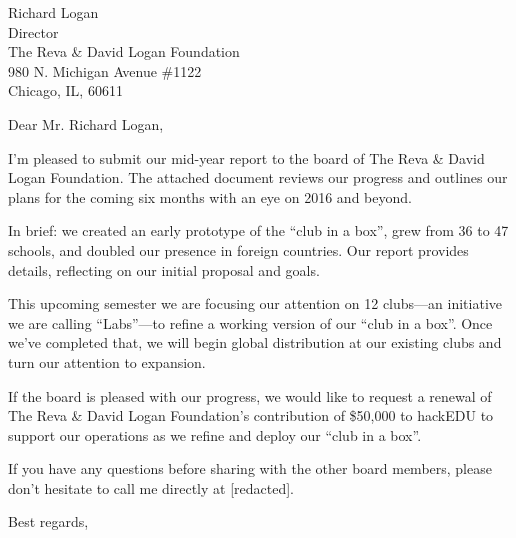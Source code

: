 \documentclass[11pt]{letter}
\begin{document}
\begin{letter}{
    Richard Logan \\
    Director \\
    The Reva \& David Logan Foundation \\
    980 N. Michigan Avenue \#1122 \\
    Chicago, IL, 60611
  }
  \opening{Dear Mr. Richard Logan,}

  I'm pleased to submit our mid-year report to the board of The Reva \& David
  Logan Foundation. The attached document reviews our progress and outlines our
  plans for the coming six months with an eye on 2016 and beyond.

  In brief: we created an early prototype of the ``club in a box'', grew from 36
  to 47 schools, and doubled our presence in foreign countries. Our report
  provides details, reflecting on our initial proposal and goals.

  This upcoming semester we are focusing our attention on 12 clubs---an
  initiative we are calling ``Labs''---to refine a working version of our ``club
  in a box''. Once we've completed that, we will begin global distribution at
  our existing clubs and turn our attention to expansion.

  If the board is pleased with our progress, we would like to request a renewal
  of The Reva \& David Logan Foundation's contribution of \$50,000 to hackEDU to
  support our operations as we refine and deploy our ``club in a box''.

  If you have any questions before sharing with the other board members, please
  don't hesitate to call me directly at [redacted].

  \closing{
    Best regards, \\
     \\
  }
\end{letter}
\end{document}

